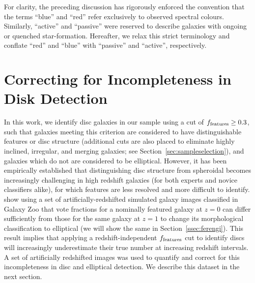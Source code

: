 \documentclass[useAMS,usenatbib]{mn2e}
\begin{document}
For clarity, the preceding discussion has rigorously enforced the convention that the terms ``blue'' and ``red'' refer exclusively to observed spectral colours. Similarly, ``active'' and ``passive'' were reserved to describe galaxies with ongoing or quenched star-formation. Hereafter, we relax this strict terminology and conflate ``red'' and ``blue'' with ``passive'' and ``active'', respectively.

\section{Correcting for Incompleteness in Disk Detection}
\label{sec:correction}
In this work, we identify disc galaxies in our sample using a cut of $f_{\rm features}\ge0.3$, such that galaxies meeting this criterion are considered to have distinguishable features or disc structure (additional cuts are also placed to eliminate highly inclined, irregular, and merging galaxies; see Section~\ref{sec:sampleselection}), and galaxies which do not are considered to be elliptical. However, it has been empirically established that distinguishing disc structure from spheroidal becomes increasingly challenging in high redshift galaxies (for both experts and novice classifiers alike), for which features are less resolved and more difficult to identify. \citet{Willett2016} show using a set of artificially-redshifted simulated galaxy images classified in Galaxy Zoo that vote fractions for a nominally featured galaxy at $z=0$ can differ sufficiently from those for the same galaxy at $z=1$ to change its morphological classification to elliptical (we will show the same in Section~\ref{ssec:ferengi}).  This result implies that applying a redshift-independent $f_{\rm features}$ cut to identify discs will increasingly underestimate their true number at increasing redshift intervals. A set of artificially redshifted images was used to quantify and correct for this incompleteness in disc and elliptical detection. We describe this dataset in the next section.
 
\end{document}
